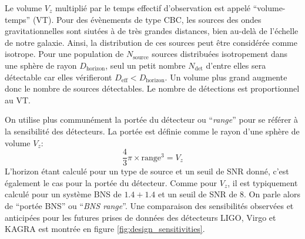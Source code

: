 Le volume $V_z$ multiplié par le temps effectif d'observation est appelé ``volume-temps'' (VT).
Pour des évènements de type CBC, les sources des ondes gravitationnelles sont siutées à de très grandes distances, bien au-delà de l'échelle de notre galaxie.
Ainsi, la distribution de ces sources peut être considérée comme isotrope.
Pour une population de $N_{\textrm{source}}$ sources distribuées isotropement dans une sphère de rayon $D_{\textrm{horizon}}$, seul un petit nombre $N_{\textrm{det}}$ d'entre elles sera détectable car elles vérifieront $D_{\textrm{eff}}<D_{\textrm{horizon}}$.
Un volume plus grand augmente donc le nombre de sources détectables.
Le nombre de détections est proportionnel au VT.

On utilise plus communément la portée du détecteur ou ``\textit{range}'' pour se référer à la sensibilité des détecteurs.
La portée est définie comme le rayon d'une sphère de volume $V_z$:
\begin{equation}
  \frac{4}{3} \pi \times \textrm{range}^3 = V_z
\end{equation}
L'horizon étant calculé pour un type de source et un seuil de SNR donné, c'est également le cas pour la portée du détecteur.
Comme pour $V_z$, il est typiquement calculé pour un système BNS de $1.4+1.4$ \msun et un seuil de SNR de 8.
On parle alors de ``portée BNS'' ou ``\textit{BNS range}''.
Une comparaison des sensibilités observées et anticipées pour les futures prises de données des détecteurs LIGO, Virgo et KAGRA est montrée en figure \ref{fig:design_sensitivities}.



